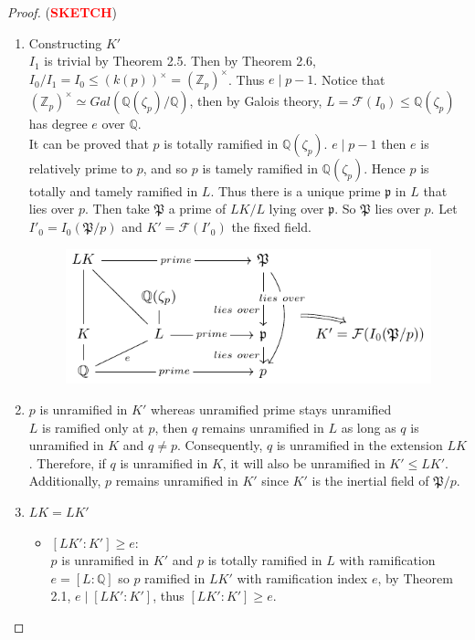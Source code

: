 \begin{proof}(\textcolor{red}{\textbf{SKETCH}})
~\begin{enumerate}
\item Constructing $K'$\\
    $I_1$ is trivial by Theorem 2.5. Then by Theorem 2.6, $I_0/I_1 = I_0 \leq (k(p))^\times = (\mathbb{Z}_p)^\times$. Thus $e \mid p-1$. Notice that $(\mathbb{Z}_p)^\times \simeq Gal(\mathbb{Q}(\zeta_p)/\mathbb{Q})$, then by Galois theory, $L = \mathcal{F}(I_0) \leq \mathbb{Q}(\zeta_p)$ has degree $e$ over $\mathbb{Q}$.
    \\
    \noindent
    It can be proved that $p$ is totally ramified in $\mathbb{Q}(\zeta_p)$. $e \mid p - 1$ then $e$ is relatively prime to $p$, and so $p$ is tamely ramified in $\mathbb{Q}(\zeta_p)$. Hence $p$ is totally and tamely ramified in $L$. Thus there is a unique prime $\mathfrak{p}$ in $L$ that lies over $p$. Then take $\mathfrak{P}$ a prime of $LK/L$ lying over $\mathfrak{p}$. So $\mathfrak{P}$ lies over $p$. Let $I'_0 = I_0(\mathfrak{P}/p)$ and $K' = \mathcal{F}(I'_0)$ the fixed field.
    \begin{figure}[!htpb]
    \centering
    \includegraphics[width=0.6\linewidth]{Figures/figure6.pdf}
    \end{figure}
\item $p$ is unramified in $K'$ whereas unramified prime stays unramified\\
    $L$ is ramified only at $p$, then $q$ remains unramified in $L$  as long as $q$ is unramified in $K$ and $q \neq p$. Consequently, $q$ is unramified in the extension $LK$. Therefore, if $q$ is unramified in $K$, it will also be unramified in $K' \leq LK'$. Additionally, $p$ remains unramified in $K'$ since $K'$ is the inertial field of $\mathfrak{P}/p$.
\item $LK=LK'$
    \begin{itemize}
    \item $[LK' : K'] \geq e$:\\
        $p$ is unramified in $K'$ and $p$ is totally ramified in $L$ with ramification $e = [L : \mathbb{Q}]$ so $p$ ramified in $LK'$ with ramification index $e$, by Theorem 2.1, $e \mid [LK':K']$, thus $[LK' : K'] \geq e$.

\end{itemize}
\end{enumerate}
\end{proof}
